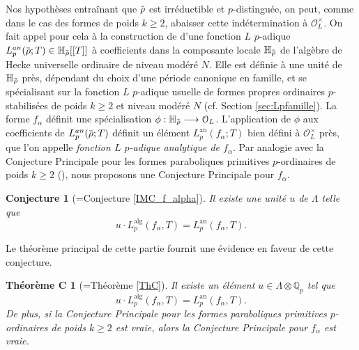 \documentclass[12pt]{amsart}
\newcommand\bH{\mathbb{H}}
\newcommand\Qp{\mathbb{Q}_{p}}
\newcommand\cO{\mathcal{O}}
\newcommand{\ob}[1]{\mkern 1.5mu\overline{\mkern-1.5mu#1\mkern-1.5mu}\mkern 1.5mu}
\newcommand{\an}{\textrm{an}}
\newcommand{\alg}{\textrm{alg}}
\theoremstyle{defstyle}
\theoremstyle{thmstyle}
\newtheorem*{conjecture*}{Conjecture}
\newtheorem*{thC}{Théorème C}
\begin{document}
Nos hypothèses entraînant que $\ob{\rho}$ est irréductible et $p$-distinguée, on peut, comme dans le cas des formes de poids $k\geq 2$, abaisser cette indétermination à $\cO_L^\times$. On fait appel pour cela à la construction de \cite{emerton2006variation} d'une fonction $L$ $p$-adique $L_p^{\an}(\ob{\rho};T)\in\bH_{\ob{\rho}}[[T]]$ à coefficients dans la composante locale $\bH_{\ob{\rho}}$ de l'algèbre de Hecke universelle ordinaire de niveau modéré $N$. Elle est définie à une unité de $\bH_{\ob{\rho}}$ près, dépendant du choix d'une période canonique en famille, et se spécialisant sur la fonction $L$ $p$-adique usuelle de formes propres ordinaires $p$-stabilisées de poids $k\geq 2$ et niveau modéré $N$ (cf. Section \ref{sec:Lpfamille}). La forme $f_\alpha$ définit une spécialisation $\phi : \bH_{\ob{\rho}} \longrightarrow \cO_L$. L'application de $\phi$ aux coefficients de $L_p^{\an}(\ob{\rho};T)$ définit un élément $L_p^{\an}(f_\alpha;T)$ bien défini à $\cO_L^\times$ près, que l'on appelle\textit{ fonction $L$ $p$-adique analytique de $f_\alpha$}. Par analogie avec la Conjecture Principale pour les formes paraboliques primitives $p$-ordinaires de poids $k\geq 2$ (\cite[Conjecture 3.24]{skinner2014iwasawa}), nous proposons une Conjecture Principale pour $f_\alpha$.

\begin{conjecture*}[=Conjecture \ref{IMC_f_alpha}]
	Il existe une unité $u$ de $\Lambda$ telle que 
	$$ u \cdot L_p^{\alg}(f_\alpha,T)=L_p^{\an}(f_\alpha,T).$$
\end{conjecture*}

Le théorème principal de cette partie fournit une évidence en faveur de cette conjecture.
\begin{thC}[=Théorème \ref{ThC}] Il existe un élément $u\in\Lambda \otimes \Qp$ tel que
	$$ u \cdot L_p^{\alg}(f_\alpha,T)=L_p^{\an}(f_\alpha,T).$$
	De plus, si la Conjecture Principale pour les formes paraboliques primitives $p$-ordinaires de poids $k\geq 2$ est vraie, alors la Conjecture Principale pour $f_\alpha$ est vraie.
\end{thC}
\end{document}
